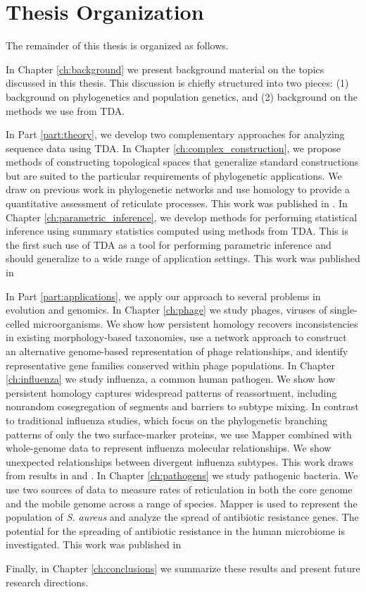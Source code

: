 \section{Thesis Organization}

The remainder of this thesis is organized as follows.

In Chapter \ref{ch:background} we present background material on the topics discussed in this thesis.
This discussion is chiefly structured into two pieces: (1) background on phylogenetics and population genetics, and (2) background on the methods we use from TDA.

In Part \ref{part:theory}, we develop two complementary approaches for analyzing sequence data using TDA.
In Chapter \ref{ch:complex_construction}, we propose methods of constructing topological spaces that generalize standard constructions but are suited to the particular requirements of phylogenetic applications.
We draw on previous work in phylogenetic networks and use homology to provide a quantitative assessment of reticulate processes.
This work was published in \cite{Emmett:2015a}.
In Chapter \ref{ch:parametric_inference}, we develop methods for performing statistical inference using summary statistics computed using methods from TDA.
This is the first such use of TDA as a tool for performing parametric inference and should generalize to a wide range of application settings.
This work was published in \cite{Emmett:2014b}

In Part \ref{part:applications}, we apply our approach to several problems in evolution and genomics.
In Chapter \ref{ch:phage} we study phages, viruses of single-celled microorganisms.
We show how persistent homology recovers inconsistencies in existing morphology-based taxonomies, use a network approach to construct an alternative genome-based representation of phage relationships, and identify representative gene families conserved within phage populations.
In Chapter \ref{ch:influenza} we study influenza, a common human pathogen.
We show how persistent homology captures widespread patterns of reassortment, including nonrandom cosegregation of segments and barriers to subtype mixing.
In contrast to traditional influenza studies, which focus on the phylogenetic branching patterns of only the two surface-marker proteins, we use Mapper combined with whole-genome data to represent influenza molecular relationships.
We show unexpected relationships between divergent influenza subtypes.
This work draws from results in \cite{Chan:2013} and \cite{Emmett:2014b}.
In Chapter \ref{ch:pathogens} we study pathogenic bacteria.
We use two sources of data to measure rates of reticulation in both the core genome and the mobile genome across a range of species.
Mapper is used to represent the population of \emph{S. aureus} and analyze the spread of antibiotic resistance genes.
The potential for the spreading of antibiotic resistance in the human microbiome is investigated.
This work was published in \cite{Emmett:2014a}

Finally, in Chapter \ref{ch:conclusions} we summarize these results and present future research directions.